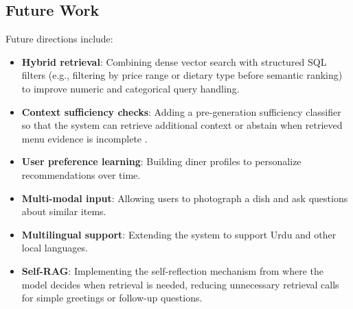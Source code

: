 \subsection{Future Work}
Future directions include:
\begin{itemize}
    \item \textbf{Hybrid retrieval}: Combining dense vector search with structured SQL filters (e.g., filtering by price range or dietary type before semantic ranking) to improve numeric and categorical query handling.
    \item \textbf{Context sufficiency checks}: Adding a pre-generation sufficiency classifier so that the system can retrieve additional context or abstain when retrieved menu evidence is incomplete \cite{Rashtchian2025SufficientContextBlog}.
    \item \textbf{User preference learning}: Building diner profiles to personalize recommendations over time.
    \item \textbf{Multi-modal input}: Allowing users to photograph a dish and ask questions about similar items.
    \item \textbf{Multilingual support}: Extending the system to support Urdu and other local languages.
    \item \textbf{Self-RAG}: Implementing the self-reflection mechanism from \cite{Asai2024SelfRAG} where the model decides when retrieval is needed, reducing unnecessary retrieval calls for simple greetings or follow-up questions.
\end{itemize}
